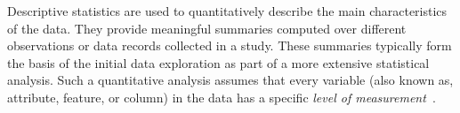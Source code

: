 \begin{comment}

 Licensed to the Apache Software Foundation (ASF) under one
 or more contributor license agreements.  See the NOTICE file
 distributed with this work for additional information
 regarding copyright ownership.  The ASF licenses this file
 to you under the Apache License, Version 2.0 (the
 "License"); you may not use this file except in compliance
 with the License.  You may obtain a copy of the License at

   http://www.apache.org/licenses/LICENSE-2.0

 Unless required by applicable law or agreed to in writing,
 software distributed under the License is distributed on an
 "AS IS" BASIS, WITHOUT WARRANTIES OR CONDITIONS OF ANY
 KIND, either express or implied.  See the License for the
 specific language governing permissions and limitations
 under the License.

\end{comment}

\newcommand{\UnivarScriptName}{\texttt{\tt Univar-Stats.dml}}
\newcommand{\BivarScriptName}{\texttt{\tt bivar-stats.dml}}

\newcommand{\OutputRowIDMinimum}{1}
\newcommand{\OutputRowIDMaximum}{2}
\newcommand{\OutputRowIDRange}{3}
\newcommand{\OutputRowIDMean}{4}
\newcommand{\OutputRowIDVariance}{5}
\newcommand{\OutputRowIDStDeviation}{6}
\newcommand{\OutputRowIDStErrorMean}{7}
\newcommand{\OutputRowIDCoeffVar}{8}
\newcommand{\OutputRowIDQuartiles}{?, 13, ?}
\newcommand{\OutputRowIDMedian}{13}
\newcommand{\OutputRowIDIQMean}{14}
\newcommand{\OutputRowIDSkewness}{9}
\newcommand{\OutputRowIDKurtosis}{10}
\newcommand{\OutputRowIDStErrorSkewness}{11}
\newcommand{\OutputRowIDStErrorCurtosis}{12}
\newcommand{\OutputRowIDNumCategories}{15}
\newcommand{\OutputRowIDMode}{16}
\newcommand{\OutputRowIDNumModes}{17}
\newcommand{\OutputRowText}[1]{\mbox{(output row~{#1})\hspace{0.5pt}:}}

\newcommand{\NameStatR}{Pearson's correlation coefficient}
\newcommand{\NameStatChi}{Pearson's~$\chi^2$}
\newcommand{\NameStatPChi}{$P\textrm{-}$value of Pearson's~$\chi^2$}
\newcommand{\NameStatV}{Cram\'er's~$V$}
\newcommand{\NameStatEta}{Eta statistic}
\newcommand{\NameStatF}{$F$~statistic}
\newcommand{\NameStatRho}{Spearman's rank correlation coefficient}

Descriptive statistics are used to quantitatively describe the main characteristics of the data.
They provide meaningful summaries computed over different observations or data records
collected in a study.  These summaries typically form the basis of the initial data exploration
as part of a more extensive statistical analysis.  Such a quantitative analysis assumes that
every variable (also known as, attribute, feature, or column) in the data has a specific
\emph{level of measurement}~\cite{Stevens1946:scales}.

